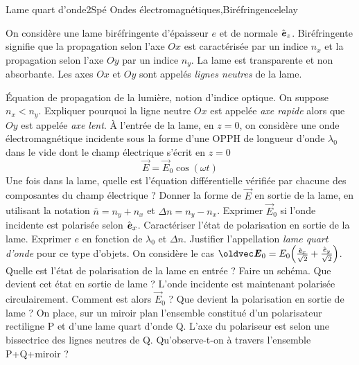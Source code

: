 \begin{exercise}{Lame quart d'onde}{2}{Spé}
{Ondes électromagnétiques,Biréfringence}{lelay}

On considère une lame biréfringente d'épaisseur $e$ et de normale $\hat{\bm{\mathit{e}}}_z$. Biréfringente signifie que la propagation selon l'axe $Ox$ est caractérisée par un indice $n_x$ et la propagation selon l'axe $Oy$ par un indice $n_y$. La lame est transparente et non absorbante. Les axes $Ox$ et $Oy$ sont appelés \emph{lignes neutres} de la lame.
\begin{questions}
    \questioncours Équation de propagation de la lumière, notion d'indice optique.
    \question On suppose $n_x < n_y$. Expliquer pourquoi la ligne neutre $Ox$ est appelée \textit{axe rapide} alors que $Oy$ est appelée \textit{axe lent}.
    \question À l'entrée de la lame, en $z = 0$, on considère une onde électromagnétique incidente sous la forme d'une OPPH de longueur d'onde $\lambda_0$ dans le vide dont le champ électrique s'écrit en $z=0$
    $$
    \vec{E} = \vec{E}_0\cos(\omega t)
    $$
    Une fois dans la lame, quelle est l'équation différentielle vérifiée par chacune des composantes du champ électrique ?
    \question Donner la forme de $\vec{E}$ en sortie de la lame, en utilisant la notation $\bar{n} = n_y+n_x$ et $\Delta n = n_y-n_x$.
    \question Exprimer $\vec{E}_0$ si l'onde incidente est polarisée selon $\hat{\bm{\mathit{e}}}_x$. Caractériser l'état de polarisation en sortie de la lame.
    \question Exprimer $e$ en fonction de $\lambda_0$ et $\Delta n$. Justifier l'appellation \textit{lame quart d'onde} pour ce type d'objets.
    \question On considère le cas $\vec{E}_0 = E_0 \qty(\frac{\ve_x}{\sqrt{2}}+\frac{\ve_y}{\sqrt{2}})$. Quelle est l'état de polarisation de la lame en entrée ? Faire un schéma. Que devient cet état en sortie de lame ?
    \question L'onde incidente est maintenant polarisée circulairement. Comment est alors $\vec{E}_0$ ? Que devient la polarisation en sortie de lame ?
    \question On place, sur un miroir plan l'ensemble constitué d'un polarisateur rectiligne P et d'une lame quart d'onde Q. L'axe du polariseur est  selon une bissectrice des lignes neutres de Q. Qu'observe-t-on à travers l'ensemble P+Q+miroir ?
\end{questions}

\end{exercise}